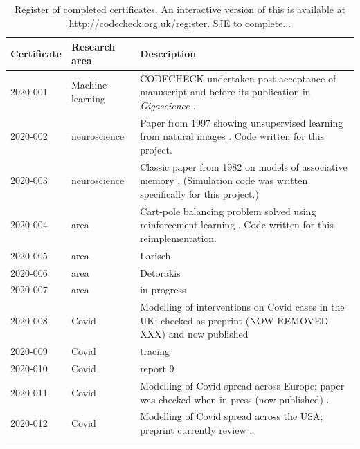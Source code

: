 \documentclass[12pt]{article}
\begin{document}
\begin{table}
  \centering

  \begin{tabular}{llp{11cm}}
    \toprule
    Certificate & Research area & Description \\ \midrule
    2020-001 \cite{cert-2020-001} &
    Machine learning & CODECHECK undertaken post acceptance of
    manuscript and before its publication in \textit{Gigascience}
    \cite{Piccolo2020-lo}.
    \\
    2020-002  \cite{cert-2020-002} & neuroscience & Paper from 1997
 showing unsupervised learning from natural images \cite{Hancock1992-mp}.
 Code written for this project.
    \\
    2020-003  \cite{cert-2020-003} & neuroscience &
                                                     Classic paper
                                                     from 1982 on
                                                     models of
                                                     associative
                                                     memory
                                                     \cite{Hopfield1982-mz}.
    (Simulation code was written specifically for this project.)\\
    2020-004  \cite{cert-2020-004} & area & Cart-pole balancing problem solved using reinforcement learning \cite{Barto1983-rg}.  Code written for this reimplementation.\\
    2020-005  \cite{cert-2020-005} & area & Larisch \\
    2020-006  \cite{cert-2020-006} & area & Detorakis \\
    2020-007  \cite{cert-2020-007} & area & in progress \\
    2020-008  \cite{cert-2020-008} & Covid & Modelling of
    interventions on Covid  cases in the UK; checked as preprint (NOW REMOVED XXX)
    and now published \cite{Davies2020-vj} \\
    2020-009  \cite{cert-2020-009} & Covid &  tracing \\
    2020-010  \cite{cert-2020-010} & Covid &  report 9 \\
    2020-011  \cite{cert-2020-011} & Covid & Modelling of Covid
    spread across Europe;  paper was checked when in press (now  published) \cite{Flaxman2020-yb}. \\
    2020-012  \cite{cert-2020-012} & Covid &   Modelling of Covid spread across the USA; preprint currently review \cite{Unwin2020}. \\
    \\ \bottomrule
  \end{tabular}
  \caption{Register of completed certificates.  An interactive version
  of this is available at \url{http://codecheck.org.uk/register}.  SJE
to complete...}
  \label{tab:register}
\end{table}
\end{document}
